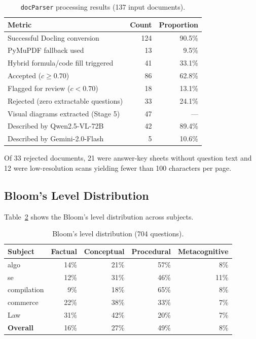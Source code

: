 \documentclass[12pt, a4paper]{article}
\begin{document}
\begin{table}[H]
\centering
\caption{\texttt{docParser} processing results (137 input documents).}
\label{tab:parsing}
\begin{tabular}{lrr}
\toprule
\textbf{Metric} & \textbf{Count} & \textbf{Proportion} \\
\midrule
Successful Docling conversion              & 124 & 90.5\% \\
PyMuPDF fallback used                      &  13 &  9.5\% \\
Hybrid formula/code fill triggered         &  41 & 33.1\% \\
Accepted ($c \geq 0.70$)                   &  86 & 62.8\% \\
Flagged for review ($c < 0.70$)            &  18 & 13.1\% \\
Rejected (zero extractable questions)      &  33 & 24.1\% \\
\midrule
Visual diagrams extracted (Stage 5)        &  47 & --- \\
\quad Described by Qwen2.5-VL-72B          &  42 & 89.4\% \\
\quad Described by Gemini-2.0-Flash        &   5 & 10.6\% \\
\bottomrule
\end{tabular}
\end{table}

\noindent Of 33 rejected documents, 21 were answer-key sheets without question text
and 12 were low-resolution scans yielding fewer than 100 characters per page.

\subsection{Bloom's Level Distribution}

Table~\ref{tab:bloom} shows the Bloom's level distribution across subjects.

\begin{table}[H]
\centering
\caption{Bloom's level distribution (704 questions).}
\label{tab:bloom}
\begin{tabular}{lrrrr}
\toprule
\textbf{Subject} & \textbf{Factual} & \textbf{Conceptual} & \textbf{Procedural}
  & \textbf{Metacognitive} \\
\midrule
algo        & 14\% & 21\% & 57\% & 8\%  \\
se          & 12\% & 31\% & 46\% & 11\% \\
compilation &  9\% & 18\% & 65\% & 8\%  \\
commerce    & 22\% & 38\% & 33\% & 7\%  \\
Law         & 31\% & 42\% & 20\% & 7\%  \\
\midrule
\textbf{Overall} & 16\% & 27\% & 49\% & 8\% \\
\bottomrule
\end{tabular}
\end{table}
\end{document}
